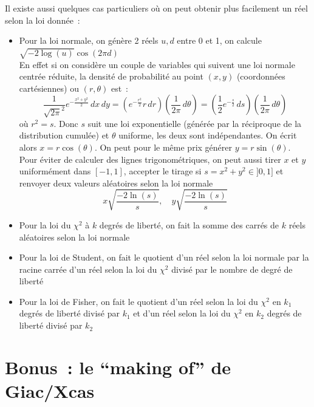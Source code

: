 \documentclass[a4paper,11pt]{article}
\begin{document}
Il existe aussi quelques cas particuliers o\`u
on peut obtenir plus facilement un r\'eel selon la loi
donn\'ee~:
\begin{itemize}
\item Pour la loi normale, on g\'en\`ere 2 r\'eels $u,d$
entre 0 et 1, on calcule \\
$\sqrt{-2 \log(u)} \cos(2\pi d)$\\
En effet si on considère un couple de variables qui
suivent une loi normale centrée réduite, la densité de probabilité
au point $(x,y)$ (coordonnées cartésiennes) ou $(r,\theta)$ est~:
$$ \frac{1}{\sqrt{2\pi}^2} e^{-\frac{x^2+y^2}{2}} \, dx \, dy
=  \left( e^{-\frac{r^2}{2}} r  \, dr \right)
\left( \frac{1}{2\pi} \, d\theta \right)
= \left( \frac12 e^{-\frac s2} \, ds \right)
\left( \frac{1}{2\pi} \, d\theta \right)$$
où $r^2=s$. Donc $s$ suit une loi exponentielle (générée
par la réciproque de la distribution cumulée) et $\theta$
uniforme, les deux sont indépendantes. On écrit 
alors $x=r\cos(\theta)$. On peut pour le même prix
générer $y=r\sin(\theta)$. \\
Pour éviter de calculer
des lignes trigonométriques, on peut aussi tirer
$x$ et $y$ uniformément dans $[-1,1]$, accepter le tirage
si $s=x^2+y^2 \in ]0,1]$ et renvoyer deux valeurs
aléatoires selon la loi normale
$$ x \sqrt{\frac{-2\ln(s)}{s}}, \quad y \sqrt{\frac{-2\ln(s)}{s}} $$
\item Pour la loi du $\chi^2$ \`a $k$ degr\'es de libert\'e, 
on fait la somme
des carr\'es de $k$ r\'eels al\'eatoires selon la loi normale
\item Pour la loi de Student, on fait le quotient d'un réel
selon la loi normale par la racine carrée
d'un réel selon la loi du $\chi^2$ divisé par le nombre
de degré de liberté
\item Pour la loi de Fisher, on fait le quotient d'un réel
selon la loi du $\chi^2$ en $k_1$ degrés de liberté divisé par
$k_1$ et d'un réel
selon la loi du $\chi^2$ en $k_2$ degrés de liberté divisé par
$k_2$
\end{itemize}


\pagebreak

\appendix

\section{Bonus~: le ``making of'' de Giac/Xcas}
\end{document}

